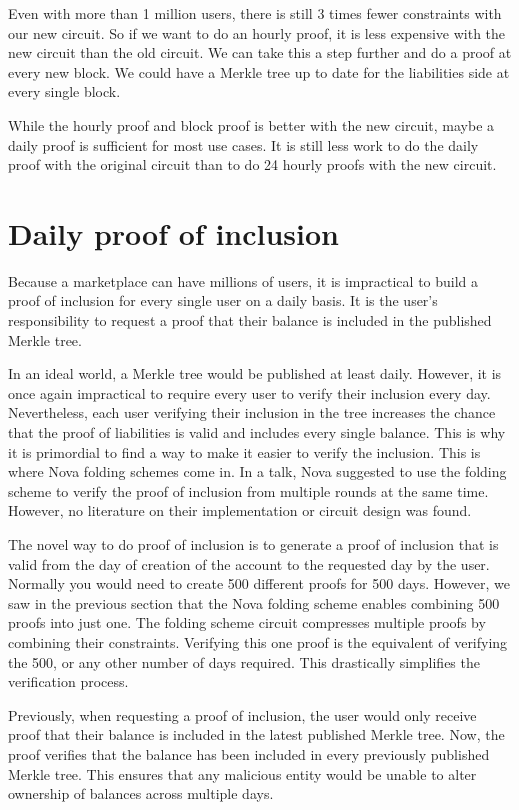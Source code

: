 Even with more than 1 million users, there is still 3 times fewer constraints with our new circuit.
So if we want to do an hourly proof, it is less expensive with the new circuit than the old circuit.
We can take this a step further and do a proof at every new block. We could have a Merkle tree up to date for the liabilities side at every single block.

While the hourly proof and block proof is better with the new circuit, maybe a daily proof is sufficient for most use cases.
It is still less work to do the daily proof with the original circuit than to do 24 hourly proofs with the new circuit. 

\section{Daily proof of inclusion}
Because a marketplace can have millions of users, it is impractical to build a proof of inclusion for every single user on a daily basis.
It is the user's responsibility to request a proof that their balance is included in the published Merkle tree.

In an ideal world, a Merkle tree would be published at least daily. However, it is once again impractical to require every user to verify their inclusion every day.
Nevertheless, each user verifying their inclusion in the tree increases the chance that the proof of liabilities is valid and includes every single balance.
This is why it is primordial to find a way to make it easier to verify the inclusion. This is where Nova folding schemes come in.
In a talk\cite{NS23}, Nova suggested to use the folding scheme to verify the proof of inclusion from multiple rounds at the same time. 
However, no literature on their implementation or circuit design was found. 

The novel way to do proof of inclusion is to generate a proof of inclusion that is valid from the day of creation of the account to the requested day by the user.
Normally you would need to create 500 different proofs for 500 days. However, we saw in the previous section that the Nova folding scheme enables combining 500 proofs into just one.
The folding scheme circuit compresses multiple proofs by combining their constraints.
Verifying this one proof is the equivalent of verifying the 500, or any other number of days required.
This drastically simplifies the verification process.

Previously, when requesting a proof of inclusion, the user would only receive proof that their balance is included in the latest published Merkle tree. Now, the proof verifies that the balance has been included in every previously published Merkle tree. 
This ensures that any malicious entity would be unable to alter ownership of balances across multiple days. 

